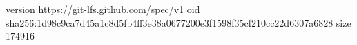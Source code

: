 version https://git-lfs.github.com/spec/v1
oid sha256:1d98c9ca7d45a1c8d5fb4ff3e38a0677200e3f1598f35cf210cc22d6307a6828
size 174916
